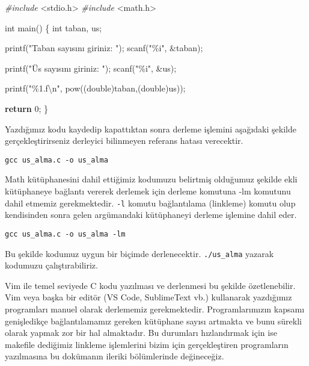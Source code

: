 \documentclass[
]{book}
\newenvironment{Shaded}{\begin{snugshade}}{\end{snugshade}}
\newcommand{\ControlFlowTok}[1]{\textcolor[rgb]{0.13,0.29,0.53}{\textbf{#1}}}
\newcommand{\DataTypeTok}[1]{\textcolor[rgb]{0.13,0.29,0.53}{#1}}
\newcommand{\DecValTok}[1]{\textcolor[rgb]{0.00,0.00,0.81}{#1}}
\newcommand{\ImportTok}[1]{#1}
\newcommand{\NormalTok}[1]{#1}
\newcommand{\PreprocessorTok}[1]{\textcolor[rgb]{0.56,0.35,0.01}{\textit{#1}}}
\newcommand{\SpecialCharTok}[1]{\textcolor[rgb]{0.00,0.00,0.00}{#1}}
\newcommand{\StringTok}[1]{\textcolor[rgb]{0.31,0.60,0.02}{#1}}
\begin{document}
\begin{Shaded}
\begin{Highlighting}[]
\PreprocessorTok{\#include }\ImportTok{<stdio.h>}
\PreprocessorTok{\#include }\ImportTok{<math.h>}

\DataTypeTok{int}\NormalTok{ main()}
\NormalTok{\{}
    \DataTypeTok{int}\NormalTok{ taban, us; }
  
\NormalTok{    printf(}\StringTok{"Taban sayısını giriniz: "}\NormalTok{);}
\NormalTok{    scanf(}\StringTok{"\%i"}\NormalTok{, \&taban);}
  
\NormalTok{    printf(}\StringTok{"Üs sayısını giriniz: "}\NormalTok{);}
\NormalTok{    scanf(}\StringTok{"\%i"}\NormalTok{, \&us);}

\NormalTok{    printf(}\StringTok{"\%1.f}\SpecialCharTok{\textbackslash{}n}\StringTok{"}\NormalTok{, pow((}\DataTypeTok{double}\NormalTok{)taban,(}\DataTypeTok{double}\NormalTok{)us));}

    \ControlFlowTok{return} \DecValTok{0}\NormalTok{;}
\NormalTok{\}}
\end{Highlighting}
\end{Shaded}

Yazdığımız kodu kaydedip kapattıktan sonra derleme işlemini aşağıdaki şekilde gerçekleştirirseniz derleyici bilinmeyen referans hatası verecektir.

\texttt{gcc\ us\_alma.c\ -o\ us\_alma}

Math kütüphanesini dahil ettiğimiz kodumuzu belirtmiş olduğumuz şekilde ekli kütüphaneye bağlantı vererek derlemek için derleme komutuna -lm komutunu dahil etmemiz gerekmektedir. \texttt{-l} komutu bağlantılama (linkleme) komutu olup kendisinden sonra gelen argümandaki kütüphaneyi derleme işlemine dahil eder.

\texttt{gcc\ us\_alma.c\ -o\ us\_alma\ -lm}

Bu şekilde kodumuz uygun bir biçimde derlenecektir. \texttt{./us\_alma} yazarak kodumuzu çalıştırabiliriz.

Vim ile temel seviyede C kodu yazılması ve derlenmesi bu şekilde özetlenebilir. Vim veya başka bir editör (VS Code, SublimeText vb.) kullanarak yazdığımız programları manuel olarak derlememiz gerekmektedir. Programlarımızın kapsamı genişledikçe bağlantılamamız gereken kütüphane sayısı artmakta ve bunu sürekli olarak yapmak zor bir hal almaktadır. Bu durumları hızlandırmak için ise makefile dediğimiz linkleme işlemlerini bizim için gerçekleştiren programların yazılmasına bu dokümanın ileriki bölümlerinde değineceğiz.
\end{document}
